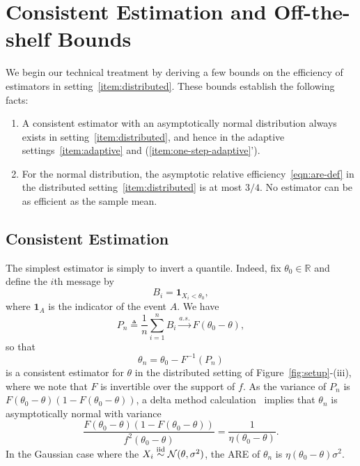 \section{Consistent Estimation and Off-the-shelf Bounds \label{sec:preliminary}}

We begin our technical treatment by deriving a few
bounds on the efficiency of estimators in
setting~\eqref{item:distributed}. These bounds establish the
following facts:
\begin{enumerate}[1.]
\item A consistent estimator with an asymptotically normal distribution
  always exists in setting~\eqref{item:distributed}, and hence in the
  adaptive settings~\eqref{item:adaptive} and
  (\ref{item:one-step-adaptive}').
\item For the normal distribution, the asymptotic relative
  efficiency~\eqref{eqn:are-def} in the distributed
  setting~\eqref{item:distributed} is at most $3/4$. No estimator can be as
  efficient as the sample mean.
\end{enumerate}

\subsection{Consistent Estimation}
The simplest estimator is simply to invert a quantile. Indeed,
fix $\theta_0 \in \mathbb R$ and define the $i$th message by 
\[
B_i = \mathbf 1_{X_i<\theta_0}, 
\]
where $\mathbf 1_A$ is the indicator of the event $A$. We have
\[
P_n \triangleq\frac{1}{n} \sum_{i=1}^n B_i \overset{a.s.}{\rightarrow} F(\theta_0 - \theta),  
\]
so that 
\begin{equation}
\label{eq:estimator_naive}
{\theta}_n = \theta_0 - F^{-1}\left( P_n \right)
\end{equation}
is a consistent estimator for $\theta$ in the distributed setting of
Figure~\ref{fig:setup}-(iii), where we note that $F$ is invertible over the
support of $f$. As the variance of $P_n$ is
$F(\theta_0-\theta)\left(1-F(\theta_0-\theta)\right)$, a delta method
calculation~\cite[Ch.~23]{VanDerVaart98} implies that ${\theta}_n$ is
asymptotically normal with variance
\begin{equation*}
  \frac{F(\theta_0-\theta)\left(1-F(\theta_0-\theta)\right)}{f^2(\theta_0-\theta)} = \frac{1}{
\eta(\theta_0-\theta)}.
\end{equation*}
In the Gaussian case where the $X_i \stackrel{\textup{iid}}{\sim} \mathcal{N}(\theta, \sigma^2)$, the
ARE of ${\theta}_n$ is $\eta(\theta_0 - \theta)\sigma^2$.

